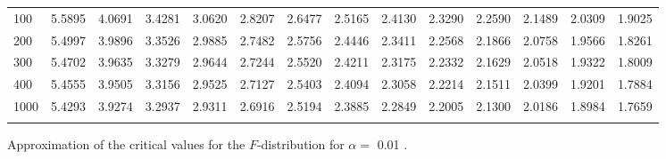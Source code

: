 {\begin{tabular}{l|lllllllllllll}
\\ 
100 & 5.5895 & 4.0691 & 3.4281 & 3.0620 & 2.8207 & 2.6477 & 2.5165 & 2.4130 & 2.3290 & 2.2590 & 2.1489 & 2.0309 & 1.9025 \\[5pt] \arrayrulecolor{light-gray}\hline\arrayrulecolor{black}  
200 & 5.4997 & 3.9896 & 3.3526 & 2.9885 & 2.7482 & 2.5756 & 2.4446 & 2.3411 & 2.2568 & 2.1866 & 2.0758 & 1.9566 & 1.8261 \\[5pt] \arrayrulecolor{light-gray}\hline\arrayrulecolor{black}  
300 & 5.4702 & 3.9635 & 3.3279 & 2.9644 & 2.7244 & 2.5520 & 2.4211 & 2.3175 & 2.2332 & 2.1629 & 2.0518 & 1.9322 & 1.8009 \\[5pt] \arrayrulecolor{light-gray}\hline\arrayrulecolor{black}  
400 & 5.4555 & 3.9505 & 3.3156 & 2.9525 & 2.7127 & 2.5403 & 2.4094 & 2.3058 & 2.2214 & 2.1511 & 2.0399 & 1.9201 & 1.7884 \\[5pt] \arrayrulecolor{light-gray}\hline\arrayrulecolor{black}  
1000 & 5.4293 & 3.9274 & 3.2937 & 2.9311 & 2.6916 & 2.5194 & 2.3885 & 2.2849 & 2.2005 & 2.1300 & 2.0186 & 1.8984 & 1.7659 \\[5pt] \arrayrulecolor{light-gray}\hline\arrayrulecolor{black}  
\end{tabular}}
\clearpage

Approximation of the critical values for the $F$-distribution for $\alpha=$ 0.01 . 

